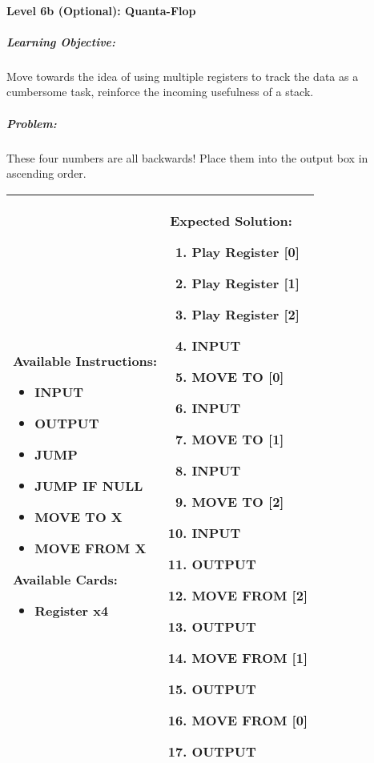 \paragraph{Level 6b (Optional): Quanta-Flop}
\subparagraph{Learning Objective:} Move towards the idea of using multiple registers to track the data as a cumbersome task, reinforce the incoming usefulness of a stack.

\subparagraph{Problem:} These four numbers are all backwards! Place them into the output box in ascending order.

\begin{center}
    \begin{tabular}{ | m{6cm} | m{8cm} | } 
        \hline
            \textbf{Available Instructions:} 
            \begin{itemize}
                \setlength\itemsep{-.35em}
                \item INPUT
                \item OUTPUT
                \item JUMP
                \item JUMP IF NULL
                \item MOVE TO X
                \item MOVE FROM X
            \end{itemize}
            \textbf{Available Cards:} 
            \begin{itemize}
                \setlength\itemsep{-.35em}
                \item Register x4
            \end{itemize}& 
            \textbf{Expected Solution:} 
            \begin{enumerate}
                \setlength\itemsep{-.35em}
                \item Play Register [0]
                \item Play Register [1]
		\item Play Register [2]
                \item INPUT
                \item MOVE TO [0]
                \item INPUT
                \item MOVE TO [1]
                \item INPUT
		\item MOVE TO [2]
		\item INPUT
                \item OUTPUT
		\item MOVE FROM [2]
		\item OUTPUT
                \item MOVE FROM [1] 
                \item OUTPUT
                \item MOVE FROM [0] 
                \item OUTPUT
            \end{enumerate}
            \\
        \hline
    \end{tabular}
\end{center}


